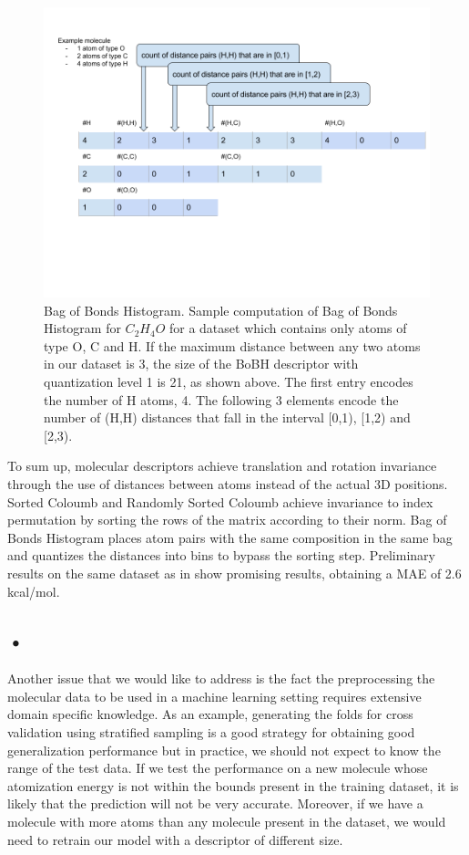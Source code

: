 \documentclass[10pt,journal,a4paper]{IEEEtran}
\begin{document}
\begin{figure}[h!]

\includegraphics[scale=0.25]{HistogramOfDistances.png}
\caption{Bag of Bonds Histogram.
Sample computation of Bag of Bonds Histogram for $C_2H_4O$ for a dataset which contains only atoms of type O, C and H. If the maximum distance between any two atoms in our dataset is 3, the size of the BoBH descriptor with quantization level  1 is 21, as shown above. The first entry encodes the number of H atoms, 4. The following 3 elements encode the number of (H,H) distances that fall in the interval [0,1), [1,2) and [2,3).
}
\label{fig:BoBH}
\end{figure}


To sum up, molecular descriptors achieve translation and rotation invariance through the use of
distances between atoms instead of the actual 3D positions. Sorted Coloumb and Randomly Sorted Coloumb achieve invariance to index permutation by sorting the rows of the matrix according to their norm. Bag of Bonds Histogram places atom pairs with the same composition in the same bag and quantizes the distances into bins to bypass the sorting step. Preliminary results on the same dataset as in \cite{montavon2012learning}  show promising results, obtaining a MAE of 2.6 kcal/mol.

\subsection*{•}
Another issue that we would like to address is the fact the preprocessing the molecular data to be used in a machine learning setting requires extensive domain specific knowledge. As an example, generating the folds for cross validation using stratified sampling is a good strategy for obtaining good generalization performance but in practice, we should not expect to know the range of the test data. If we test the performance on a new molecule whose atomization energy is not within the bounds present in the training dataset, it is likely that the prediction will not be very accurate. Moreover, if we have a molecule with more atoms than any molecule present in the dataset, we would need to retrain our model with a  descriptor of different size. 
\end{document}
